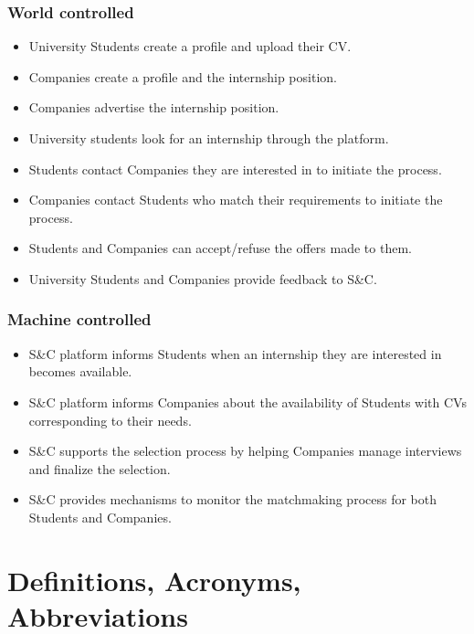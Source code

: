 \subsubsection{World controlled}
\begin{itemize}
    \item [\text{[SP1]}] University Students create a profile and upload their CV.
    \item [\text{[SP2]}] Companies create a profile and the internship position.
    \item [\text{[SP3]}] Companies advertise the internship position.
    \item [\text{[SP4]}] University students look for an internship through the platform.
    \item [\text{[SP5]}] Students contact Companies they are interested in to initiate the process.
    \item [\text{[SP6]}] Companies contact Students who match their requirements to initiate the process.
    \item [\text{[SP7]}] Students and Companies can accept/refuse the offers made to them.
    \item [\text{[SP8]}] University Students and Companies provide feedback to S\&C.
\end{itemize}
\subsubsection{Machine controlled}
\begin{itemize}
    \item [\text{[SP9]}] S\&C platform informs Students when an internship they are interested in becomes available.
    \item [\text{[SP10]}] S\&C platform informs Companies about the availability of Students with CVs corresponding to their needs.
    \item [\text{[SP11]}] S\&C supports the selection process by helping Companies manage interviews and finalize the selection.
    \item [\text{[SP12]}] S\&C provides mechanisms to monitor the matchmaking process for both Students and Companies.
\end{itemize}

\section{Definitions, Acronyms, Abbreviations}
